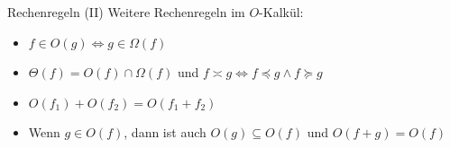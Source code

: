 \begin{frame}{Rechenregeln (II)}
	Weitere Rechenregeln im $O$-Kalkül:
	\begin{itemize}[<+->]
		\item $f \in O(g) \iff g \in \Omega(f)$
		\item $\Theta(f) = O(f) \cap \Omega(f)$ und $f \asymp g \iff f \preceq g \wedge f \succeq g$ 
		\item $O(f_1) + O(f_2) = O(f_1 + f_2)$
		\item Wenn $g \in O(f)$, dann ist auch $O(g) \subseteq O(f)$ und $O(f + g) = O(f)$
	\end{itemize}
	
\end{frame}


%
%
